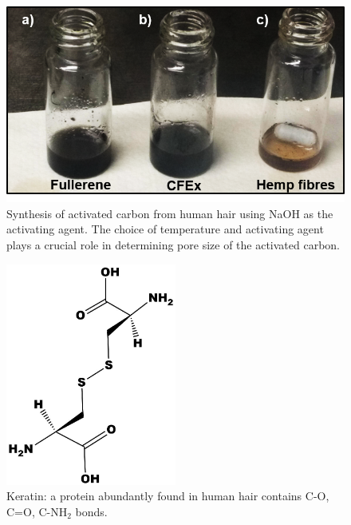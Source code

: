 \begin{figure}[tbh!]
  \centering
  \includegraphics[width=\textwidth]{Figures/chap5fig/cfexsol}
    \caption{Synthesis of activated carbon from human hair using NaOH as the activating agent. The choice of temperature and activating agent plays a crucial role in determining pore size of the activated carbon.}
  \label{Figures/chap5fig:cfexsol}
\end{figure}

\begin{figure}[tbh!]
  \centering
  \includegraphics[width=0.5\textwidth]{Figures/chap5fig/keratin}
    \caption{Keratin: a protein abundantly found in human hair contains C-O, C=O, C-NH$_2$ bonds.} 
    \label{Figures/chap5fig:keratin}
\end{figure}

